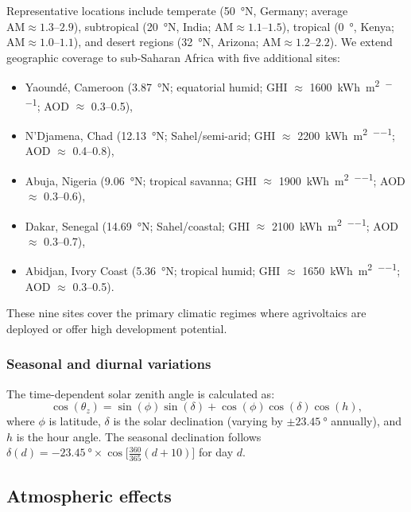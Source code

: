 \documentclass[11pt,a4paper]{article}
\begin{document}
Representative locations include temperate (\SI{50}{\degree}N, Germany; average $\mathrm{AM} \approx \numrange{1.3}{2.9}$), subtropical (\SI{20}{\degree}N, India; $\mathrm{AM} \approx \numrange{1.1}{1.5}$), tropical (\SI{0}{\degree}, Kenya; $\mathrm{AM} \approx \numrange{1.0}{1.1}$), and desert regions (\SI{32}{\degree}N, Arizona; $\mathrm{AM} \approx \numrange{1.2}{2.2}$). We extend geographic coverage to sub-Saharan Africa with five additional sites:
\begin{itemize}
    \item Yaound\'e, Cameroon (\SI{3.87}{\degree}N; equatorial humid; GHI $\approx$ \SI{1600}{\kWh\per\metre\squared\per\yr}; AOD $\approx$ \numrange{0.3}{0.5}),
    \item N'Djamena, Chad (\SI{12.13}{\degree}N; Sahel/semi-arid; GHI $\approx$ \SI{2200}{\kWh\per\metre\squared\per\yr}; AOD $\approx$ \numrange{0.4}{0.8}),
    \item Abuja, Nigeria (\SI{9.06}{\degree}N; tropical savanna; GHI $\approx$ \SI{1900}{\kWh\per\metre\squared\per\yr}; AOD $\approx$ \numrange{0.3}{0.6}),
    \item Dakar, Senegal (\SI{14.69}{\degree}N; Sahel/coastal; GHI $\approx$ \SI{2100}{\kWh\per\metre\squared\per\yr}; AOD $\approx$ \numrange{0.3}{0.7}),
    \item Abidjan, Ivory Coast (\SI{5.36}{\degree}N; tropical humid; GHI $\approx$ \SI{1650}{\kWh\per\metre\squared\per\yr}; AOD $\approx$ \numrange{0.3}{0.5}).
\end{itemize}
These nine sites cover the primary climatic regimes where agrivoltaics are deployed or offer high development potential.

\subsubsection{Seasonal and diurnal variations}

The time-dependent solar zenith angle is calculated as:
\begin{equation}
\cos(\theta_z) = \sin(\phi)\sin(\delta) + \cos(\phi)\cos(\delta)\cos(h),
\end{equation}
where $\phi$ is latitude, $\delta$ is the solar declination (varying by $\pm \SI{23.45}{\degree}$ annually), and $h$ is the hour angle. The seasonal declination follows $\delta(d) = -\SI{23.45}{\degree} \times \cos\!\bigl[\tfrac{360}{365}(d + 10)\bigr]$ for day $d$.

\subsection{Atmospheric effects}
\end{document}
